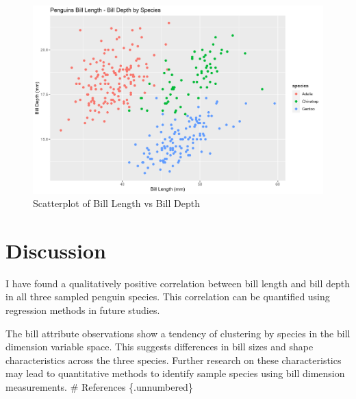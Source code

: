 \documentclass[preprint, 3p,
authoryear]{elsarticle} %
\begin{document}
\begin{figure}

{\centering \includegraphics[width=1\linewidth]{../Figures/scatterplot_billLenDep} 

}

\caption{\label{scatter}Scatterplot of Bill Length vs Bill Depth}\label{fig:scatter}
\end{figure}

\hypertarget{discussion}{%
\section{Discussion}\label{discussion}}

I have found a qualitatively positive correlation between bill length
and bill depth in all three sampled penguin species. This correlation
can be quantified using regression methods in future studies.

The bill attribute observations show a tendency of clustering by species
in the bill dimension variable space. This suggests differences in bill
sizes and shape characteristics across the three species. Further
research on these characteristics may lead to quantitative methods to
identify sample species using bill dimension measurements. \pagebreak \#
References \{.unnumbered\}


\end{document}

